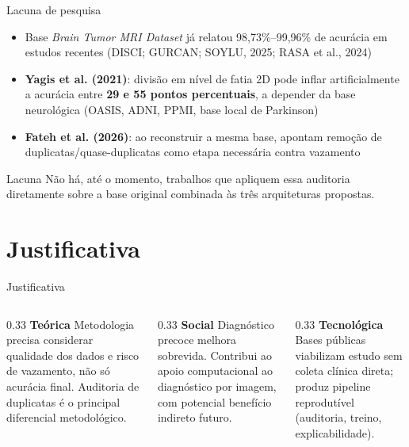 \documentclass[aspectratio=169]{beamer}
\begin{document}
\begin{frame}{Lacuna de pesquisa}
  \begin{itemize}
    \item Base \textit{Brain Tumor MRI Dataset} já relatou 98,73\%--99,96\% de acurácia em estudos recentes (DISCI; GURCAN; SOYLU, 2025; RASA et al., 2024)
    \item \textbf{Yagis et al. (2021)}: divisão em nível de fatia 2D pode inflar artificialmente a acurácia entre \textbf{29 e 55 pontos percentuais}, a depender da base neurológica (OASIS, ADNI, PPMI, base local de Parkinson)
    \item \textbf{Fateh et al. (2026)}: ao reconstruir a mesma base, apontam remoção de duplicatas/quase-duplicatas como etapa necessária contra vazamento
  \end{itemize}
  \begin{alertblock}{Lacuna}
    Não há, até o momento, trabalhos que apliquem essa auditoria diretamente sobre a base original combinada às três arquiteturas propostas.
  \end{alertblock}
\end{frame}

\section{Justificativa}
\begin{frame}{Justificativa}
  \begin{columns}[T]
    \begin{column}{0.33\textwidth}
      \textbf{Teórica}
      \small Metodologia precisa considerar qualidade dos dados e risco de vazamento, não só acurácia final. Auditoria de duplicatas é o principal diferencial metodológico.
    \end{column}
    \begin{column}{0.33\textwidth}
      \textbf{Social}
      \small Diagnóstico precoce melhora sobrevida. Contribui ao apoio computacional ao diagnóstico por imagem, com potencial benefício indireto futuro.
    \end{column}
    \begin{column}{0.33\textwidth}
      \textbf{Tecnológica}
      \small Bases públicas viabilizam estudo sem coleta clínica direta; produz pipeline reprodutível (auditoria, treino, explicabilidade).
    \end{column}
  \end{columns}
\end{frame}
\end{document}
